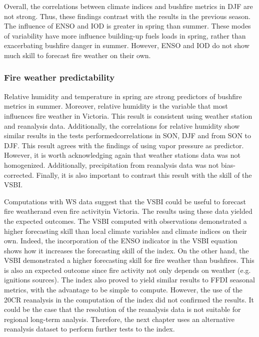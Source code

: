 Overall, the correlations between climate indices and bushfire metrics
in DJF are not strong. Thus, these findings contrast with the results
in the previous season. The influence of ENSO and IOD is greater in
spring than summer. These modes of variability have more influence
building-up fuels loads in spring, rather than exacerbating bushfire
danger in summer. However, ENSO and IOD do not show much skill to
forecast fire weather on their own.


\subsubsection{Fire weather predictability}

Relative humidity and temperature in spring are strong predictors
of bushfire metrics in summer. Moreover, relative humidity is the
variable that most influences fire weather in Victoria. This result
is consistent using weather station and reanalysis data. Additionally,
the correlations for relative humidity show similar results in the
tests performed\textemdash correlations in SON, DJF and from SON to
DJF\textemdash . This result agrees with the findings of \citet{Harris2013}
using vapor pressure as predictor. However, it is worth acknowledging
again that weather stations data was not homogenized. Additionally,
precipitation from reanalysis data was not bias-corrected. Finally,
it is also important to contrast this result with the skill of the
VSBI.

Computations with WS data suggest that the VSBI could be useful to
forecast fire weather\textemdash and even fire activity\textemdash in
Victoria. The results using these data yielded the expected outcomes.
The VSBI computed with observations demonstrated a higher forecasting
skill than local climate variables and climate indices on their own.
Indeed, the incorporation of the ENSO indicator in the VSBI equation
shows how it increases the forecasting skill of the index. On the
other hand, the VSBI demonstrated a higher forecasting skill for fire
weather than bushfires. This is also an expected outcome since fire
activity not only depends on weather (e.g. ignitions sources). The
index also proved to yield similar results to FFDI seasonal metrics,
with the advantage to be simple to compute. However, the use of the
20CR reanalysis in the computation of the index did not confirmed
the results. It could be the case that the resolution of the reanalysis
data is not suitable for regional long-term analysis. Therefore, the
next chapter uses an alternative reanalysis dataset to perform further
tests to the index. 


